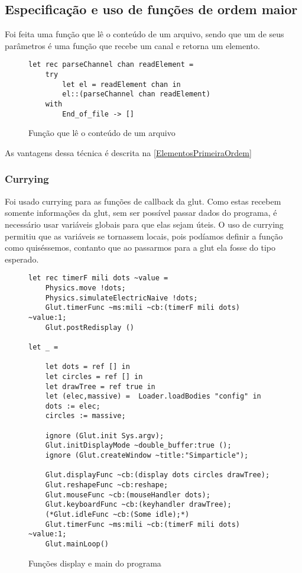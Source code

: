 \documentclass[a4paper,10pt]{article}
\begin{document}
\subsection{Especificação e uso de funções de ordem maior}

Foi feita uma função que lê o conteúdo de um arquivo, sendo que um de seus parâmetros é uma função que recebe um canal e retorna um elemento.

\begin{figure}[H]
	\centering	
	\begin{lstlisting}
let rec parseChannel chan readElement =
	try
		let el = readElement chan in
		el::(parseChannel chan readElement)
	with
		End_of_file -> []
	\end{lstlisting}
	\caption{Função que lê o conteúdo de um arquivo}
\end{figure}
	
	As vantagens dessa técnica é descrita na \autoref{ElementosPrimeiraOrdem}
	
\subsubsection{Currying}
	
	Foi usado currying para as funções de callback da glut. Como estas recebem somente informações da glut, sem ser possível passar dados do programa, é necessário usar variáveis globais para que elas sejam úteis. O uso de currying permitiu que as variáveis se tornassem locais, pois podíamos definir a função como quiséssemos, contanto que ao passarmos para a glut ela fosse do tipo esperado.
	
	\begin{figure}[H]
	\centering	
	\begin{lstlisting}
let rec timerF mili dots ~value =
	Physics.move !dots;
	Physics.simulateElectricNaive !dots;
	Glut.timerFunc ~ms:mili ~cb:(timerF mili dots) ~value:1;
	Glut.postRedisplay ()
	
let _ =

	let dots = ref [] in
	let circles = ref [] in
	let drawTree = ref true in
	let (elec,massive) =  Loader.loadBodies "config" in
	dots := elec;
	circles := massive;

	ignore (Glut.init Sys.argv);
	Glut.initDisplayMode ~double_buffer:true ();
	ignore (Glut.createWindow ~title:"Simparticle");

	Glut.displayFunc ~cb:(display dots circles drawTree);
	Glut.reshapeFunc ~cb:reshape;
	Glut.mouseFunc ~cb:(mouseHandler dots);
	Glut.keyboardFunc ~cb:(keyhandler drawTree);
	(*Glut.idleFunc ~cb:(Some idle);*)
	Glut.timerFunc ~ms:mili ~cb:(timerF mili dots) ~value:1;
	Glut.mainLoop()
	\end{lstlisting}
	\caption{Funções display e main do programa}
\end{figure}
\end{document}
